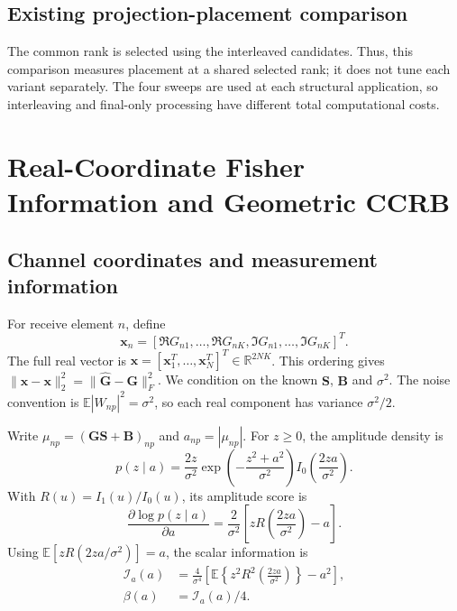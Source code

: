 \documentclass[11pt,a4paper]{article}
\newcommand{\appendices}{\appendix}
\begin{document}
\subsection{Existing projection-placement comparison}


The common rank is selected using the interleaved candidates. Thus, this
comparison measures placement at a shared selected rank; it does not tune
each variant separately. The four sweeps are used at each structural
application, so interleaving and final-only processing have different
total computational costs.

\appendices
\section{Real-Coordinate Fisher Information and Geometric CCRB}
\label{app:revision-ccrb}

\subsection{Channel coordinates and measurement information}

For receive element $n$, define
\begin{equation}
\mathbf x_n=
 [\Re G_{n1},\ldots,\Re G_{nK},
  \Im G_{n1},\ldots,\Im G_{nK}]^T.
\end{equation}
The full real vector is
$\mathbf x=[\mathbf x_1^T,\ldots,\mathbf x_N^T]^T\in\mathbb R^{2NK}$.
This ordering gives
$\|\widehat{\mathbf x}-\mathbf x\|_2^2
=\|\widehat{\mathbf G}-\mathbf G\|_F^2$.
We condition on the known $\mathbf S$, $\mathbf B$ and $\sigma^2$.
The noise convention is $\mathbb E|W_{np}|^2=\sigma^2$, so each real
component has variance $\sigma^2/2$.

Write $\mu_{np}=(\mathbf G\mathbf S+\mathbf B)_{np}$ and
$a_{np}=|\mu_{np}|$. For $z\geq0$, the amplitude density is
\begin{equation}
p(z\mid a)=\frac{2z}{\sigma^2}
 \exp\!\left(-\frac{z^2+a^2}{\sigma^2}\right)
 I_0\!\left(\frac{2za}{\sigma^2}\right).
\end{equation}
With $R(u)=I_1(u)/I_0(u)$, its amplitude score is
\begin{equation}
\frac{\partial\log p(z\mid a)}{\partial a}
=\frac{2}{\sigma^2}
 \left[zR\!\left(\frac{2za}{\sigma^2}\right)-a\right].
\end{equation}
Using $\mathbb E[zR(2za/\sigma^2)]=a$, the scalar information is
\begin{align}
\mathcal I_a(a)
&=\frac{4}{\sigma^4}
 \left[\mathbb E\!\left\{z^2R^2\!\left(\frac{2za}{\sigma^2}\right)\right\}
 -a^2\right],
\label{eq:revision-scalar-information}\\
\beta(a)&=\mathcal I_a(a)/4.
\end{align}
\end{document}

